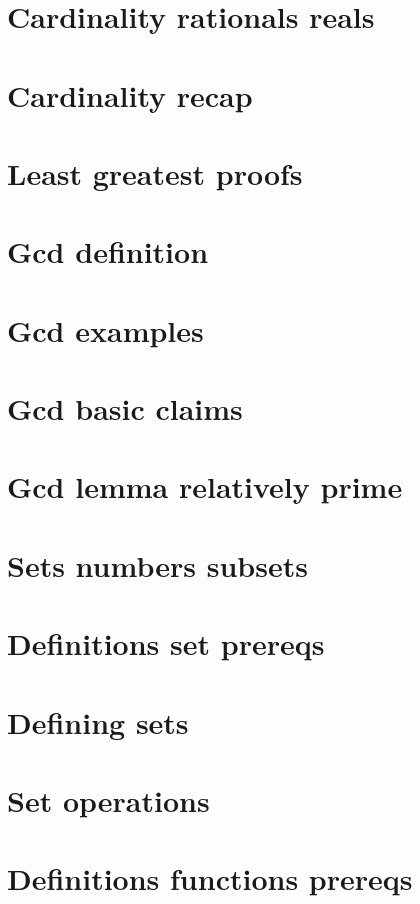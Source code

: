 
\section*{Cardinality rationals reals}

\vfill
\section*{Cardinality recap}

\vfill
\section*{Least greatest proofs}

\vfill
\section*{Gcd definition}

\vfill
\section*{Gcd examples}

\vfill
\section*{Gcd basic claims}

\vfill
\section*{Gcd lemma relatively prime}

\vfill
\section*{Sets numbers subsets}

\vfill
\section*{Definitions set prereqs}

\vfill
\section*{Defining sets}

\vfill
\section*{Set operations}

\vfill
\section*{Definitions functions prereqs}

\vfill

